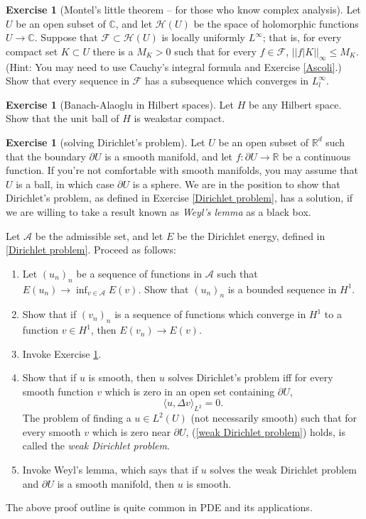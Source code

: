 \documentclass[12pt]{book}
\newcommand{\RR}{\mathbb{R}}
\newcommand{\CC}{\mathbb{C}}
\newcommand{\dfn}[1]{\emph{#1}\index{#1}}
\theoremstyle{definition}
\newtheorem{exercise}[theorem]{Exercise}
\begin{document}
\begin{exercise}[Montel's little theorem -- for those who know complex analysis]
\label{Montel}
Let $U$ be an open subset of $\CC$, and let $\mathcal H(U)$ be the space of holomorphic functions $U \to \CC$.
Suppose that $\mathcal F \subset \mathcal H(U)$ is locally uniformly $L^\infty$; that is, for every compact set $K \subset U$ there is a $M_K > 0$ such that for every $f \in \mathcal F$, $||f|K||_\infty \leq M_K$.
(Hint: You may need to use Cauchy's integral formula and Exercise \ref{Ascoli}.)
Show that every sequence in $\mathcal F$ has a subsequence which converges in $L^\infty_l$.
\end{exercise}

\begin{exercise}[Banach-Alaoglu in Hilbert spaces]
\label{Banach-Alaoglu-Sobolev}
Let $H$ be any Hilbert space. Show that the unit ball of $H$ is weakstar compact.
\end{exercise}

\begin{exercise}[solving Dirichlet's problem]
\label{Dirichlet problem 2}
Let $U$ be an open subset of $\RR^d$ such that the boundary $\partial U$ is a smooth manifold, and let $f: \partial U \to \RR$ be a continuous function.
If you're not comfortable with smooth manifolds, you may assume that $U$ is a ball, in which case $\partial U$ is a sphere.
We are in the position to show that Dirichlet's problem, as defined in Exercise \ref{Dirichlet problem}, has a solution, if we are willing to take a result known as \dfn{Weyl's lemma} as a black box.

Let $\mathcal A$ be the admissible set, and let $E$ be the Dirichlet energy, defined in \ref{Dirichlet problem}.
Proceed as follows:
\begin{enumerate}
\item Let $(u_n)_n$ be a sequence of functions in $\mathcal A$ such that $E(u_n) \to \inf_{v \in \mathcal A} E(v)$.
Show that $(u_n)_n$ is a bounded sequence in $H^1$.
\item Show that if $(v_n)_n$ is a sequence of functions which converge in $H^1$ to a function $v \in H^1$, then $E(v_n) \to E(v)$.
\item Invoke Exercise \ref{Banach-Alaoglu-Sobolev}.
\item Show that if $u$ is smooth, then $u$ solves Dirichlet's problem iff for every smooth function $v$ which is zero in an open set containing $\partial U$,
\begin{equation}
\label{weak Dirichlet problem}
\langle u, \Delta v\rangle_{L^2} = 0.
\end{equation}
The problem of finding a $u \in L^2(U)$ (not necessarily smooth) such that for every smooth $v$ which is zero near $\partial U$, (\ref{weak Dirichlet problem}) holds, is called the \dfn{weak Dirichlet problem}.
\item Invoke Weyl's lemma, which says that if $u$ solves the weak Dirichlet problem and $\partial U$ is a smooth manifold, then $u$ is smooth.
\end{enumerate}
The above proof outline is quite common in PDE and its applications.
\end{exercise}
\end{document}
